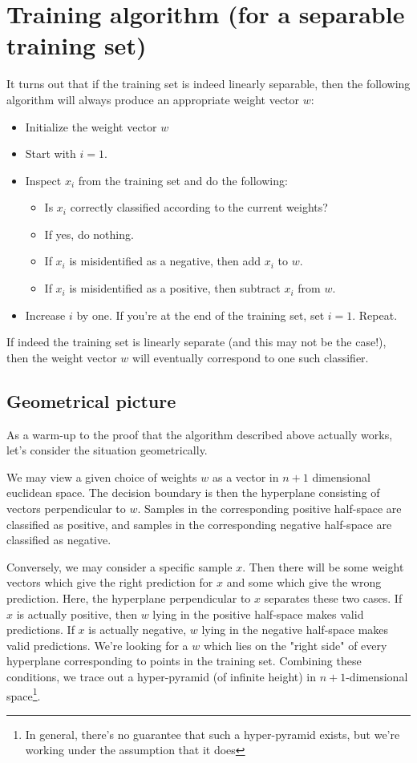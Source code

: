 \documentclass[12pt, a4paper]{article}
\numberwithin{equation}{section}
\begin{document}
\section{Training algorithm (for a separable training set)}
It turns out that if the training set is indeed linearly separable, then the following algorithm will always produce an appropriate weight vector $w$:
\begin{itemize}
\item Initialize the weight vector $w$
\item Start with $i=1$.
\item Inspect $x_i$ from the training set and do the following:
\begin{itemize}
\item Is $x_i$ correctly classified according to the current weights?
\item If yes, do nothing.
\item If $x_i$ is misidentified as a negative, then add $x_i$ to $w$.
\item If $x_i$ is misidentified as a positive, then subtract $x_i$ from $w$.
\end{itemize}
\item Increase $i$ by one. If you're at the end of the training set, set $i=1$. Repeat.
\end{itemize}
If indeed the training set is linearly separate (and this may not be the case!), then the weight vector $w$ will eventually correspond to one such classifier.

\subsection{Geometrical picture}
As a warm-up to the proof that the algorithm described above actually works, let's consider the situation geometrically.

We may view a given choice of weights $w$ as a vector in $n+1$ dimensional euclidean space. The decision boundary is then the hyperplane consisting of vectors perpendicular to $w$. Samples in the corresponding positive half-space 
are classified as positive, and samples in the corresponding negative half-space are classified as negative.

Conversely, we may consider a specific sample $x$. Then there will be some weight vectors which give the right prediction for $x$ and some which give the wrong prediction. Here, the hyperplane perpendicular to $x$ separates these two cases. If $x$ is actually positive, then $w$ lying in the positive half-space makes valid predictions. If $x$ is actually negative, $w$ lying in the negative half-space makes valid predictions. We're looking for a $w$ which lies on the "right side" of every hyperplane corresponding to points in the training set. Combining these conditions, we trace out a hyper-pyramid (of infinite height) in $n+1$-dimensional space\footnote{In general, there's no guarantee that such a hyper-pyramid exists, but we're working under the assumption that it does}.
\end{document}
